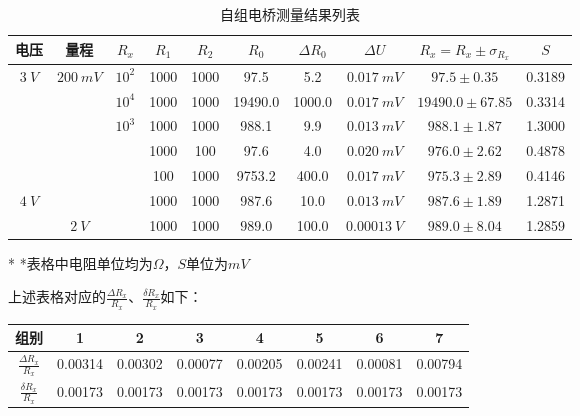 \documentclass[UTF8]{ctexart}
\begin{document}
\begin{table}[H]
\caption*{自组电桥测量结果列表}
\begin{tabular}{|c|c|c|c|c|c|c|c|c|c|}
\hline
 电压  &  量程   &   $R_x$  &  $R_1$   &  $R_2$   &  $R_0$   &   $\Delta R_0$  &  $\Delta U$     &  $R_x = R_x \pm \sigma_{R_x}$  &   $S$ \\
\hline
 \multirow{5}{*}{$3 \ V$}  & \multirow{6}{*}{$200 \ mV$} & $10^2$ &  1000 &  1000 &  97.5  &   5.2  &  $0.017 \ mV$  &  $97.5 \pm 0.35$   &  0.3189  \\ \cline{3-10} 

  &   &    $10^4$ &  1000  &  1000  &   19490.0   &1000.0  &   $0.017\ mV$  &   $19490.0 \pm 67.85$ & 0.3314  \\\cline{3-10} 

  &   &    \multirow{5}{*}{$10^3$}  &   1000 &  1000  &   988.1   &  9.9  & $0.013 \ mV$  &  $988.1 \pm 1.87$ & 1.3000  \\\cline{4-10} 

  &   &    &   1000  &  100  &  97.6  &   4.0   &  $0.020 \ mV$ &   $976.0 \pm 2.62$  &  0.4878  \\\cline{4-10} 

  &   &    &   100   &  1000 &  9753.2  &  400.0  &  $0.017 \ mV$  &  $975.3 \pm 2.89$  & 0.4146  \\\cline{4-10} \cline{1-1}

  \multirow{2}{*}{$4 \ V$} &     &   &   1000  &  1000 & 987.6   &  10.0  &  $0.013 \ mV$ & $987.6 \pm 1.89$  & 1.2871 \\\cline{4-10} \cline{2-2}

  &     $2 \ V$  &    &   1000   &  1000  &$  989.0$  &100.0  &  $0.00013 \ V$   & $989.0 \pm 8.04$  & 1.2859\\
\hline
\end{tabular}
\begin{tablenotes}
\centering
    \footnotesize
    \item[*] *表格中电阻单位均为$\Omega$，$S$单位为$mV$
\end{tablenotes}
\end{table}
上述表格对应的$\frac{\Delta R_x}{R_x}$、$\frac{\delta R_x}{R_x}$如下：
\begin{table}[H]
    \centering
    \begin{tabular}{|c|c|c|c|c|c|c|c|}
    \hline
        组别 &  1 & 2 & 3 & 4  & 5 & 6 & 7 \\
    \hline
       $\frac{\Delta R_x}{R_x}$  & 0.00314 & 0.00302 & 0.00077 & 0.00205 & 0.00241 & 0.00081  & 0.00794 \\
    \hline
       $\frac{\delta R_x}{R_x}$ & 0.00173 & 0.00173 & 0.00173 & 0.00173 & 0.00173 & 0.00173 & 0.00173 \\
    \hline
    \end{tabular}
\end{table}
\end{document}
